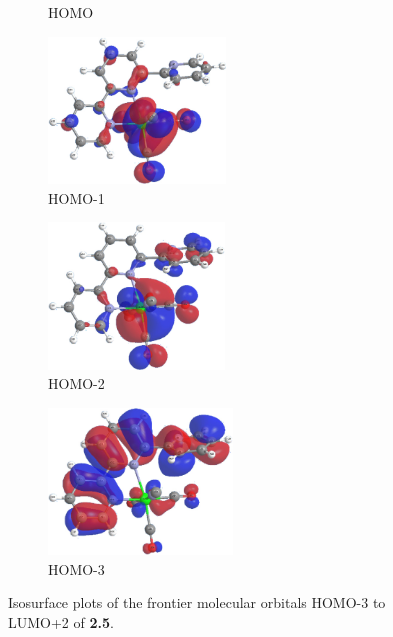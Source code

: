 \begin{figure}[!ht]
\begin{subfigure}[b]{0.31\textwidth}
  \caption{HOMO}
 \end{subfigure}
 \begin{subfigure}[b]{0.31\textwidth}
  \includegraphics[clip=true, width=\textwidth, height=39mm, keepaspectratio]{images/mos/5h-1.eps}
  \caption{HOMO-1}
 \end{subfigure}
 \begin{subfigure}[b]{0.31\textwidth}
  \includegraphics[clip=true, width=\textwidth, height=39mm, keepaspectratio]{images/mos/5h-2.eps}
  \caption{HOMO-2}
 \end{subfigure}
 \begin{subfigure}[b]{0.31\textwidth}
  \includegraphics[clip=true, width=\textwidth, height=39mm, keepaspectratio]{images/mos/5h-3.eps}
  \caption{HOMO-3}
 \end{subfigure}
\caption[Molecular orbitals HOMO-3 to LUMO+2 of \textbf{2.5}.]{Isosurface plots of the frontier molecular orbitals HOMO-3 to LUMO+2 of \textbf{2.5}.}
\label{fig.mo25}
\end{figure} 

